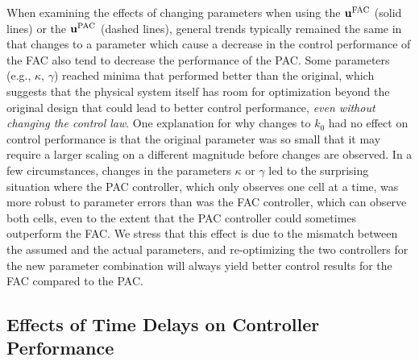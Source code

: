 \documentclass[12pt]{article}
\begin{document}
When examining the effects of changing parameters when using the $\mathbf{u}^{\rm FAC}$ (solid lines) or the $\mathbf{u}^{\rm PAC}$ (dashed lines), general trends typically remained the same in that changes to a parameter which cause a decrease in the control performance of the FAC also tend to decrease the performance of the PAC. Some parameters (e.g., $\kappa$, $\gamma$) reached minima that performed better than the original, which suggests that the physical system itself has room for optimization beyond the original design that could lead to better control performance, {\em even without changing the control law}.  One explanation for why changes to $k_0$ had no effect on control performance is that the original parameter was so small that it may require a larger scaling on a different magnitude before changes are observed. 
In a few circumstances, changes in the parameters $\kappa$ or $\gamma$ led to the surprising situation where the PAC controller, which only observes one cell at a time, was more robust to parameter errors than was the FAC controller, which can observe both cells, even to the extent that the PAC controller could sometimes outperform the FAC.  We stress that this effect is due to the mismatch between the assumed and the actual parameters, and re-optimizing the two controllers for the new parameter combination will always yield better control results for the FAC compared to the PAC.

\subsection{Effects of Time Delays on Controller Performance}
\end{document}
